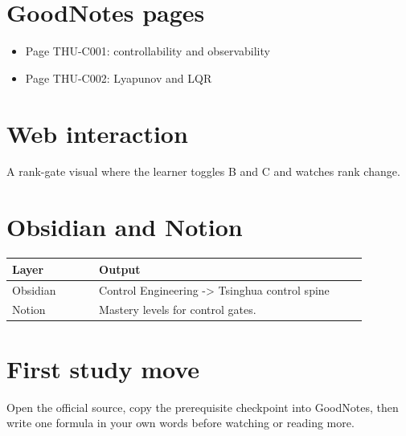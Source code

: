 \documentclass[11pt]{article}
\begin{document}
\section*{GoodNotes pages}
\begin{itemize}[leftmargin=1.4em]
  \item Page THU-C001: controllability and observability
  \item Page THU-C002: Lyapunov and LQR
\end{itemize}

\section*{Web interaction}
A rank-gate visual where the learner toggles B and C and watches rank change.

\section*{Obsidian and Notion}
\begin{tabular}{p{0.22\linewidth}p{0.68\linewidth}}
\toprule
Layer & Output \\
\midrule
Obsidian & Control Engineering -> Tsinghua control spine \\
Notion & Mastery levels for control gates. \\
\bottomrule
\end{tabular}

\section*{First study move}
Open the official source, copy the prerequisite checkpoint into GoodNotes, then write one formula in your own words before watching or reading more.
\end{document}
